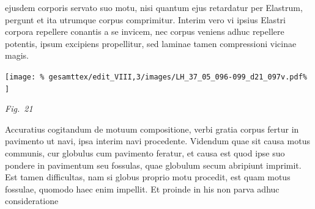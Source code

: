 %
ejusdem corporis servato suo motu, nisi quantum ejus retardatur per Elastrum\lbrack,\rbrack\protect{}  
%
pergunt et ita utrumque corpus comprimitur. Interim vero vi ipsius Elastri\protect{}  
%
corpora repellere conantis a se invicem, nec corpus veniens adhuc repellere potentis, ipsum excipiens propellitur,  
%
sed laminae\protect{} tamen compressioni vicinae magis. 
\pend
%
%
\vspace{2.0em} %
\centerline{%
\texttt{[image: \%
gesamttex/edit\_VIII,3/images/LH\_37\_05\_096-099\_d21\_097v.pdf\%
]}} 
\vspace{0.5em}
\centerline{%
\lbrack\textit{Fig.~21}\rbrack%
}
\vspace{1.5em}
%
\pstart Accuratius cogitandum de motuum compositione\protect{},  
%
verbi gratia corpus fertur in pavimento\protect{} ut  
%
navi\protect{}, ipsa interim navi procedente. Videndum quae sit causa motus communis,%
\protect{}  
%
cur globulus\protect{} cum pavimento\protect{}  
%
feratur, et causa est quod ipse suo pondere in pavimentum\protect{} 
%
%
 seu fossulas\protect{}, quae globulum\protect{} secum  
%
abripiunt imprimit. Est tamen difficultas, nam  
%
%
%
si %
globus\protect{} proprio motu procedit, 
%
%
est quam motus fossulae,\protect{} quomodo haec enim impellit.  
%
Et proinde in his non parva adhuc consideratione 
%
